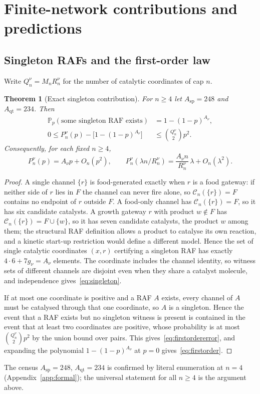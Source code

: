 \documentclass[11pt,a4paper]{article}
\theoremstyle{plain}
\newtheorem{theorem}{Theorem}[section]
\theoremstyle{definition}
\theoremstyle{remark}
\newcommand{\conventional}{\par\nopagebreak{\small\raggedright\textup{Conventional proof; not formalised.}\par}}
\newcommand{\Prob}{\mathbb{P}}
\newcommand{\cl}{\mathcal{C}}
\newcommand{\qt}{\mathrm{qt}}
\newcommand{\spc}{\mathrm{sp}}
\begin{document}
\section{Finite-network contributions and predictions}\label{sec:finite}

\subsection{Singleton RAFs and the first-order law}
Write $Q_n^\nu=M_nR_n^\nu$ for the number of catalytic coordinates of cap $n$.

\begin{theorem}[Exact singleton contribution]\label{thm:singleton}
For $n\ge4$ let $A_{\spc}=248$ and $A_{\qt}=234$. Then
\begin{align}
\Prob_p(\text{some singleton RAF exists})&=1-(1-p)^{A_\nu},\label{eq:singleton}\\
0\le P^\nu_n(p)-\bigl[1-(1-p)^{A_\nu}\bigr]&\le\binom{Q_n^\nu}{2}p^2.\label{eq:firstordererror}
\end{align}
Consequently, for each fixed $n\ge4$,
\begin{equation}\label{eq:firstorder}
P^\nu_n(p)=A_\nu p+O_n(p^2),\qquad P^\nu_n(\lambda n/R_n^\nu)=\frac{A_\nu n}{R_n^\nu}\,\lambda+O_n(\lambda^2).
\end{equation}
\end{theorem}
\begin{proof}
A single channel $\{r\}$ is food-generated exactly when $r$ is a food gateway: if neither side of $r$ lies in $F$ the channel can never fire alone, so $\cl_n(\{r\})=F$ contains no endpoint of $r$ outside $F$. A food-only channel has $\cl_n(\{r\})=F$, so it has six candidate catalysts. A growth gateway $r$ with product $w\notin F$ has $\cl_n(\{r\})=F\cup\{w\}$, so it has seven candidate catalysts, the product $w$ among them; the structural RAF definition allows a product to catalyse its own reaction, and a kinetic start-up restriction would define a different model. Hence the set of single catalytic coordinates $(x,r)$ certifying a singleton RAF has exactly $4\cdot6+7g_\nu=A_\nu$ elements. The coordinate includes the channel identity, so witness sets of different channels are disjoint even when they share a catalyst molecule, and independence gives~\eqref{eq:singleton}.

If at most one coordinate is positive and a RAF $A$ exists, every channel of $A$ must be catalysed through that one coordinate, so $A$ is a singleton. Hence the event that a RAF exists but no singleton witness is present is contained in the event that at least two coordinates are positive, whose probability is at most $\binom{Q_n^\nu}{2}p^2$ by the union bound over pairs. This gives~\eqref{eq:firstordererror}, and expanding the polynomial $1-(1-p)^{A_\nu}$ at $p=0$ gives~\eqref{eq:firstorder}.
\end{proof}
\conventional
The census $A_{\spc}=248$, $A_{\qt}=234$ is confirmed by literal enumeration at $n=4$ (Appendix~\ref{app:formal}); the universal statement for all $n\ge4$ is the argument above.
\end{document}
